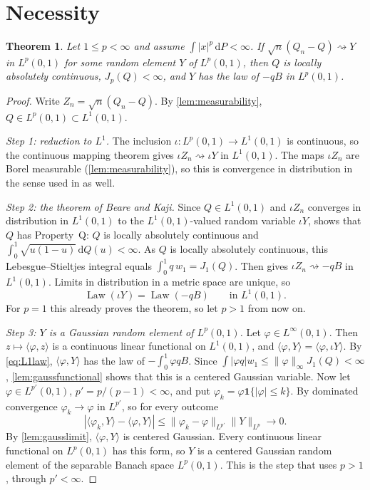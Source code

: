\documentclass[11pt]{amsart}
\newtheorem{theorem}{Theorem}[section]
\theoremstyle{remark}
\newcommand{\ind}{\mathbf{1}}
\newcommand{\dd}{\,\mathrm{d}}
\newcommand{\Lp}{L^p(0,1)}
\newcommand{\weak}{\rightsquigarrow}
\DeclareMathOperator{\Law}{Law}
\begin{document}
\section{Necessity}\label{sec:necessity}

\begin{theorem}\label{thm:necessity}
Let $1\le p<\infty$ and assume $\int|x|^p\dd P<\infty$. If $\sqrt n(Q_n-Q)\weak Y$ in $\Lp$ for some random element $Y$ of $\Lp$, then $Q$ is locally absolutely continuous, $J_p(Q)<\infty$, and $Y$ has the law of $-qB$ in $\Lp$.
\end{theorem}

\begin{proof}
Write $Z_n=\sqrt n(Q_n-Q)$. By \cref{lem:measurability}, $Q\in\Lp\subset L^1(0,1)$.

\emph{Step 1: reduction to $L^1$.} The inclusion $\iota:\Lp\to L^1(0,1)$ is continuous, so the continuous mapping theorem gives $\iota Z_n\weak\iota Y$ in $L^1(0,1)$. The maps $\iota Z_n$ are Borel measurable (\cref{lem:measurability}), so this is convergence in distribution in the sense used in \cite{BeareKaji2025} as well.

\emph{Step 2: the theorem of Beare and Kaji.} Since $Q\in L^1(0,1)$ and $\iota Z_n$ converges in distribution in $L^1(0,1)$ to the $L^1(0,1)$-valued random variable $\iota Y$, \cite[Theorem~3.2]{BeareKaji2025} shows that $Q$ has Property~Q: $Q$ is locally absolutely continuous and $\int_0^1\sqrt{u(1-u)}\dd Q(u)<\infty$. As $Q$ is locally absolutely continuous, this Lebesgue--Stieltjes integral equals $\int_0^1q\,w_1=J_1(Q)$. Then \cite[Theorem~3.1]{BeareKaji2025} gives $\iota Z_n\weak-qB$ in $L^1(0,1)$. Limits in distribution in a metric space are unique, so
\begin{equation}\label{eq:L1law}
\Law(\iota Y)=\Law(-qB)\qquad\text{in }L^1(0,1).
\end{equation}
For $p=1$ this already proves the theorem, so let $p>1$ from now on.

\emph{Step 3: $Y$ is a Gaussian random element of $\Lp$.} Let $\varphi\in L^\infty(0,1)$. Then $z\mapsto\langle\varphi,z\rangle$ is a continuous linear functional on $L^1(0,1)$, and $\langle\varphi,Y\rangle=\langle\varphi,\iota Y\rangle$. By \eqref{eq:L1law}, $\langle\varphi,Y\rangle$ has the law of $-\int_0^1\varphi qB$. Since $\int|\varphi q|w_1\le\|\varphi\|_\infty J_1(Q)<\infty$, \cref{lem:gaussfunctional} shows that this is a centered Gaussian variable. Now let $\varphi\in L^{p'}(0,1)$, $p'=p/(p-1)<\infty$, and put $\varphi_k=\varphi\ind\{|\varphi|\le k\}$. By dominated convergence $\varphi_k\to\varphi$ in $L^{p'}$, so for every outcome
\[
|\langle\varphi_k,Y\rangle-\langle\varphi,Y\rangle|\le\|\varphi_k-\varphi\|_{L^{p'}}\|Y\|_{L^p}\to0 .
\]
By \cref{lem:gausslimit}, $\langle\varphi,Y\rangle$ is centered Gaussian. Every continuous linear functional on $\Lp$ has this form, so $Y$ is a centered Gaussian random element of the separable Banach space $\Lp$. This is the step that uses $p>1$, through $p'<\infty$.


\end{proof}
\end{document}
